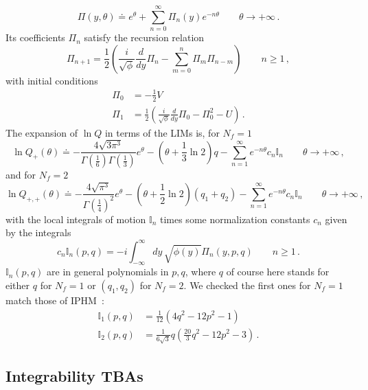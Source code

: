 \documentclass[11pt,a4paper]{elsarticle}
\def \th {\theta}
\def \ba {\begin{aligned}}
\def \ea {\end{aligned}}
\newcommand{\be}{\begin{equation}}
\newcommand{\ee}{\end{equation}}
\def\th{\theta}
\numberwithin{figure}{section}
\numberwithin{table}{section}
\begin{document}
\be 
\Pi(y,\th) \doteq e^\th+\sum_{n=0}^\infty \Pi_n(y) e^{-n \th} \qquad \th \to +\infty\,.
\ee 
Its coefficients $\Pi_n$ satisfy the recursion relation
\be  \label{WKBRecInt}
\Pi_{n+1} = \frac{1}{2} \left(\frac{i}{\sqrt{\phi}} \frac{d}{dy}\Pi_n -\sum_{m=0}^n \Pi_m \Pi_{n-m} \right) \qquad n \geq 1\,,
\ee 
with initial conditions
\be 
\ba 
\Pi_0 &=-\frac{1}{2} V\\
\Pi_1 &= \frac{1}{2} \left(\frac{i}{\sqrt{\phi}} \frac{d}{dy}\Pi_0 -\Pi_0^2-U\right) \,.
\ea 
\ee
The expansion of $\ln Q$ in terms of the LIMs is, for $N_f=1$
\be \label{asyQLIM1}
\ln Q_+(\th) \doteq -\frac{4   \sqrt{3\pi^{3}}}{\Gamma \left(\frac{1}{6}\right) \Gamma \left(\frac{1}{3}\right)} e^\th-( \th + \frac{1}{3} \ln 2) q - \sum_{n=1}^\infty e^{-n \th}c_n \mathbb{I}_n  \qquad \th \to +\infty\,,
\ee 
and for $N_f=2$
\be \label{asyQLIM2}
\ln Q_{+,+}(\th) \doteq - \frac{4\sqrt{\pi^3 }  }{\Gamma \left(\frac{1}{4}\right)^2} e^\th-( \th + \frac{1}{2} \ln 2) (q_1+q_2) -\sum_{n=1}^\infty e^{-n \th} c_n \mathbb{I}_n \qquad \th \to +\infty\,,
\ee 
with the local integrals of motion $\mathbb{I}_n$ times some normalization constants $c_n$ given by the integrals
\be 
c_n \mathbb{I}_n(p,q) =- i \int_{-\infty}^\infty dy\,\sqrt{\phi(y)} \Pi_n(y,p,q)  \qquad n \geq 1\,.
\ee 
$\mathbb{I}_n(p,q)$ are in general polynomials  in $p,q$, where $q$ of course here stands for either $q$ for $N_f=1$ or $(q_1,q_2)$ for $N_f=2$. We checked the first ones for $N_f=1$ match those of IPHM~\cite{FateevLukyanov:2005}:
\be 
\ba 
\mathbb{I}_1(p,q)&=\frac{1}{12}  \left(4 q^2-12 p^2-1\right)\\
	\mathbb{I}_2(p,q)&= \frac{1}{6\sqrt{3}}q\left(\frac{20}{3} q^2-12 p^2-3\right)\,.
\ea
\ee 


\subsection{Integrability TBAs} \label{subsecintTBA}
\end{document}
